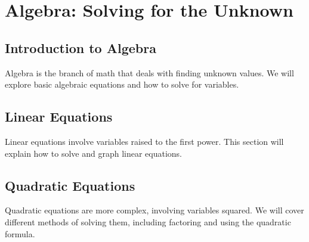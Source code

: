 \chapter{Algebra: Solving for the Unknown}
\section{Introduction to Algebra}
Algebra is the branch of math that deals with finding unknown values. We will explore basic algebraic equations and how to solve for variables.

\section{Linear Equations}
Linear equations involve variables raised to the first power. This section will explain how to solve and graph linear equations.

\section{Quadratic Equations}
Quadratic equations are more complex, involving variables squared. We will cover different methods of solving them, including factoring and using the quadratic formula.